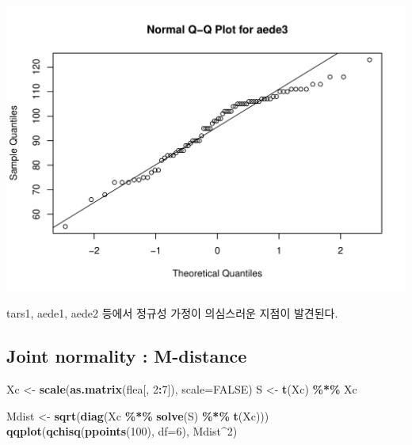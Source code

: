 \documentclass[
]{article}
\newenvironment{Shaded}{\begin{snugshade}}{\end{snugshade}}
\newcommand{\AttributeTok}[1]{\textcolor[rgb]{0.13,0.29,0.53}{#1}}
\newcommand{\ConstantTok}[1]{\textcolor[rgb]{0.56,0.35,0.01}{#1}}
\newcommand{\DecValTok}[1]{\textcolor[rgb]{0.00,0.00,0.81}{#1}}
\newcommand{\FunctionTok}[1]{\textcolor[rgb]{0.13,0.29,0.53}{\textbf{#1}}}
\newcommand{\NormalTok}[1]{#1}
\newcommand{\OtherTok}[1]{\textcolor[rgb]{0.56,0.35,0.01}{#1}}
\newcommand{\SpecialCharTok}[1]{\textcolor[rgb]{0.81,0.36,0.00}{\textbf{#1}}}
\begin{document}
\begin{center}\includegraphics[width=0.8\linewidth]{multivariate_lab_hw2_files/figure-latex/unnamed-chunk-2-6} \end{center}

tars1, aede1, aede2 등에서 정규성 가정이 의심스러운 지점이 발견된다.

\subsection{Joint normality :
M-distance}\label{joint-normality-m-distance}

\begin{Shaded}
\begin{Highlighting}[]
\NormalTok{Xc }\OtherTok{\textless{}{-}} \FunctionTok{scale}\NormalTok{(}\FunctionTok{as.matrix}\NormalTok{(flea[, }\DecValTok{2}\SpecialCharTok{:}\DecValTok{7}\NormalTok{]), }\AttributeTok{scale=}\ConstantTok{FALSE}\NormalTok{)}
\NormalTok{S }\OtherTok{\textless{}{-}} \FunctionTok{t}\NormalTok{(Xc) }\SpecialCharTok{\%*\%}\NormalTok{ Xc}

\NormalTok{Mdist }\OtherTok{\textless{}{-}} \FunctionTok{sqrt}\NormalTok{(}\FunctionTok{diag}\NormalTok{(Xc }\SpecialCharTok{\%*\%} \FunctionTok{solve}\NormalTok{(S) }\SpecialCharTok{\%*\%} \FunctionTok{t}\NormalTok{(Xc))) }
\FunctionTok{qqplot}\NormalTok{(}\FunctionTok{qchisq}\NormalTok{(}\FunctionTok{ppoints}\NormalTok{(}\DecValTok{100}\NormalTok{), }\AttributeTok{df=}\DecValTok{6}\NormalTok{), Mdist}\SpecialCharTok{\^{}}\DecValTok{2}\NormalTok{)}
\end{Highlighting}
\end{Shaded}
\end{document}

